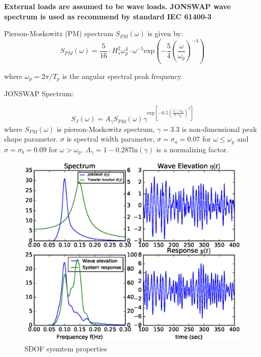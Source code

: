 \documentclass[twocolumn,10pt]{asme2e}
\begin{document}
\textbf{External loads are assumed to be wave loads. JONSWAP wave spectrum is used as recommend by standard IEC 61400-3}

Pierson-Moskowitz (PM) spectrum $S_{PM}(\omega)$ is given by:
\begin{equation}
S_{PM}(\omega) = \frac{5}{16} \cdot H_s^2 \omega_p^4 \cdot \omega^{-5} \mathrm{exp}\left(-\frac{5}{4}\left( \frac{\omega}{\omega_p} \right)^{-4}\right)
  \label{eqn:Pierson-Moskowitz}
\end{equation}

where $\omega_p = 2\pi/T_p$ is the angular spectral peak frequency.

JONSWAP Spectrum:

\begin{equation}
  S_J(\omega) = A_\gamma S_{PM}(\omega) \gamma^{\mathrm{exp}\left[-0.5(\frac{\omega-\omega_p}{\sigma \cdot \omega_p})^2\right]}
  \label{eqn:JONSWAP}
\end{equation}
where $S_{PM}(\omega)$ is pierson-Moskowitz spectrum, $\gamma = 3.3$ is non-dimensional peak shape parameter. $\sigma$ is spectral width parameter, $\sigma = \sigma_a = 0.07$ for $\omega \leq \omega_p$ and $\sigma = \sigma_b = 0.09$ for $\omega > \omega_p$. $A_\gamma = 1 - 0.287 \mathrm{ln} (\gamma)$ is a normalizing factor. 

\begin{figure}[]
  \centering
  \includegraphics{Figures/SDOF.eps}
  \caption{SDOF sysmtem properties}
  \label{fig:SDOF_400}
\end{figure}
\end{document}
